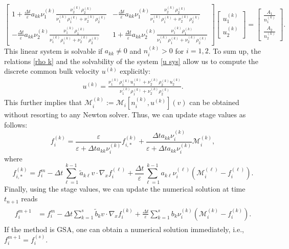 \documentclass[10pt,reqno]{amsart}
\numberwithin{equation}{section}
\begin{document}
\begin{equation}\label{u sys}
	\begin{bmatrix}
		1+ \frac{\Delta t}{\varepsilon}a_{kk}\nu_1^{(k)} \frac{ \nu_2^{(k)}\rho_2^{(k)}}{\nu_1^{(k)}\rho_1^{(k)} + \nu_2^{(k)}\rho_2^{(k)}} & -\frac{\Delta t}{\varepsilon}a_{kk}\nu_1^{(k)} \frac{ \nu_2^{(k)}\rho_2^{(k)}}{\nu_1^{(k)}\rho_1^{(k)} + \nu_2^{(k)}\rho_2^{(k)}}\\
		-\frac{\Delta t}{\varepsilon}a_{kk}\nu_2^{(k)} \frac{ \nu_1^{(k)}\rho_1^{(k)}}{\nu_1^{(k)}\rho_1^{(k)} + \nu_2^{(k)}\rho_2^{(k)}} & 1+\frac{\Delta t}{\varepsilon}a_{kk}\nu_2^{(k)} \frac{ \nu_1^{(k)}\rho_1^{(k)}}{\nu_1^{(k)}\rho_1^{(k)} + \nu_2^{(k)}\rho_2^{(k)}}
	\end{bmatrix}
	\begin{bmatrix}
		u_1^{(k)} \\
		u_2^{(k)}  
	\end{bmatrix}=	\begin{bmatrix}
		\frac{A_1}{n_1^{(k)}} \\
		\frac{A_2}{n_2^{(k)}}  
	\end{bmatrix}.
\end{equation}
This linear system is solvable if $a_{kk}\neq 0$ and $n_i^{(k)}>0$ for $i=1,2$. 
To sum up, the relations \eqref{rho k} and the solvability of the system \eqref{u sys} allow us to compute the discrete common bulk velocity $u^{(k)}$ explicitly:
\begin{align*}
	u^{(k)}= \frac{\nu_1^{(k)}\rho_1^{(k)}u_1^{(k)} + \nu_2^{(k)}\rho_2^{(k)}u_2^{(k)}}{\nu_1^{(k)}\rho_1^{(k)} + \nu_2^{(k)}\rho_2^{(k)}}.
\end{align*}
This further implies that $\mathcal{M}_i^{(k)}:=\mathcal{M}_i[n_i^{(k)},u^{(k)}](v)$ can be obtained without resorting to any Newton solver. Thus, we can update stage values as follows:
\begin{equation*}%
	f_i^{(k)} = \frac{\varepsilon}{\varepsilon + \Delta t a_{kk} \nu_i^{(k)}} f_{i,*}^{(k)} + \frac{\Delta t  a_{kk}\nu_i^{(k)}}{\varepsilon + \Delta t a_{kk}\nu_i^{(k)}}\mathcal{M}_i^{(k)}, 
\end{equation*}
where
$$
f_{i,*}^{(k)} = f_{i}^{m} - \Delta t\sum_{\ell=1}^{k-1}\tilde{a}_{k\ell} v \cdot \nabla_x f_{i}^{(\ell)} + \frac{\Delta t}{\varepsilon}\sum_{\ell=1}^{k-1}a_{k\ell} \nu_i^{(\ell)}\left(\mathcal{M}_i^{(\ell)} - f_i^{(\ell)}\right).
$$
Finally, using the stage values, we can update the numerical solution at time $t_{n+1}$ reads
\begin{align*}%
\begin{split}
	f_i^{m+1} &= f_i^{m} - \Delta t\sum_{k=1}^{s}\tilde{b}_{k} v \cdot \nabla_x f_i^{(k)} + \frac{\Delta t}{\varepsilon}\sum_{k=1}^{s}{b}_{k}\nu_i^{(k)}\left(\mathcal{M}_i^{(k)} - f_i^{(k)}\right).
\end{split}
\end{align*}
If the method is GSA, one can obtain a numerical solution immediately, i.e., $f_i^{m+1}=f_i^{(s)}$.
\end{document}
